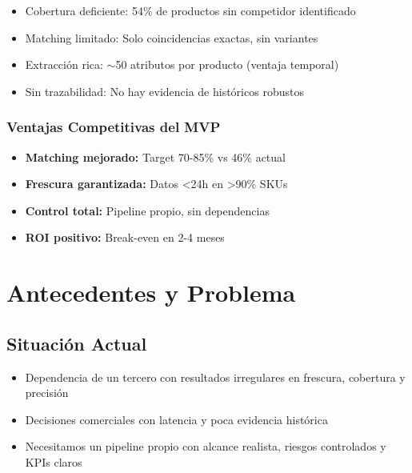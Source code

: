 \documentclass[12pt,a4paper]{article}
\begin{document}
\begin{itemize}[leftmargin=*]
    \item \textcolor{dangerred}{Cobertura deficiente:} 54\% de productos sin competidor identificado
    \item \textcolor{dangerred}{Matching limitado:} Solo coincidencias exactas, sin variantes
    \item \textcolor{successgreen}{Extracción rica:} $\sim$50 atributos por producto (ventaja temporal)
    \item \textcolor{dangerred}{Sin trazabilidad:} No hay evidencia de históricos robustos
\end{itemize}

\subsubsection*{Ventajas Competitivas del MVP}

\begin{itemize}[leftmargin=*]
    \item \textbf{Matching mejorado:} Target 70-85\% vs 46\% actual
    \item \textbf{Frescura garantizada:} Datos <24h en >90\% SKUs
    \item \textbf{Control total:} Pipeline propio, sin dependencias
    \item \textbf{ROI positivo:} Break-even en 2-4 meses
\end{itemize}

\section{Antecedentes y Problema}

\subsection{Situación Actual}

\begin{itemize}[leftmargin=*]
    \item Dependencia de un tercero con resultados irregulares en frescura, cobertura y precisión
    \item Decisiones comerciales con latencia y poca evidencia histórica
    \item Necesitamos un pipeline propio con alcance realista, riesgos controlados y KPIs claros
\end{itemize}
\end{document}
